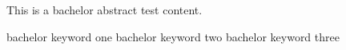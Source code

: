 \documentclass[degree=bachelor, fontset=fandol]{nwputhesis}
\begin{document}
\START
\showoutput

\frontmatter

\begin{abstract}
    这是本科测试摘要内容。
    \begin{keywords}
        本科关键词一 \sep 本科关键词二 \sep 本科关键词三
    \end{keywords}
\end{abstract}

\begin{engabstract}
    This is a bachelor abstract test content.
    \begin{engkeywords}
        bachelor keyword one \ensep bachelor keyword two \ensep bachelor keyword three
    \end{engkeywords}
\end{engabstract}

\clearpage
\OMIT
\end{document}

